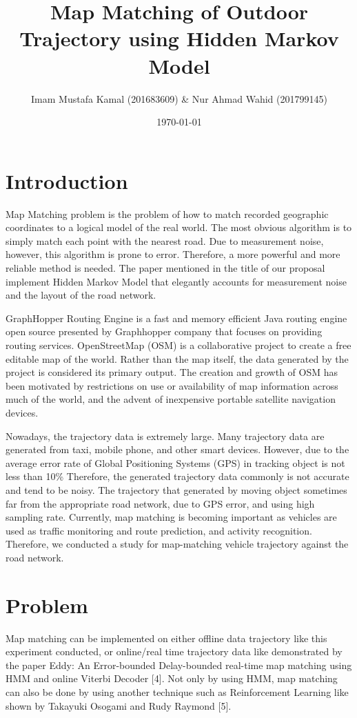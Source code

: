 \documentclass[a4paper]{article}
\title{Map Matching of Outdoor Trajectory using Hidden Markov Model}
\author{Imam Mustafa Kamal (201683609) &
Nur Ahmad Wahid (201799145)}
\date{\today}
\begin{document}
\maketitle

\section{Introduction}
\label{sec:introduction}

Map Matching problem is the problem of how to match recorded geographic coordinates to a logical model of the real world. The most obvious algorithm is to simply match each point with the nearest road. Due to measurement noise, however, this algorithm is prone to error. Therefore, a more powerful and more reliable method is needed. The paper mentioned in the title of our proposal implement Hidden Markov Model that elegantly accounts for measurement noise and the layout of the road network.

GraphHopper Routing Engine is a fast and memory efficient Java routing engine open source presented by Graphhopper company that focuses on providing routing services. OpenStreetMap (OSM) is a collaborative project to create a free editable map of the world. Rather than the map itself, the data generated by the project is considered its primary output. The creation and growth of OSM has been motivated by restrictions on use or availability of map information across much of the world, and the advent of inexpensive portable satellite navigation devices.

Nowadays, the trajectory data is extremely large. Many trajectory data are generated from taxi, mobile phone, and other smart devices. However, due to the average error rate of Global Positioning Systems (GPS) in tracking object is not less than 10\% Therefore, the generated trajectory data commonly is not accurate and tend to be noisy. The trajectory that generated by moving object sometimes far from the appropriate road network, due to GPS error, and using high sampling rate. Currently, map matching is becoming important as vehicles are used as traffic monitoring and route prediction, and activity recognition. Therefore, we conducted a study for map-matching vehicle trajectory against the road network.


\section{Problem}
\label{sec:problem}

Map matching can be implemented on either offline data trajectory like this experiment conducted, or online/real time trajectory data like demonstrated by the paper Eddy: An Error-bounded Delay-bounded real-time map matching using HMM and online Viterbi Decoder [4]. Not only by using HMM, map matching can also be done by using another technique such as Reinforcement Learning like shown by Takayuki Osogami and Rudy Raymond [5].
\end{document}
